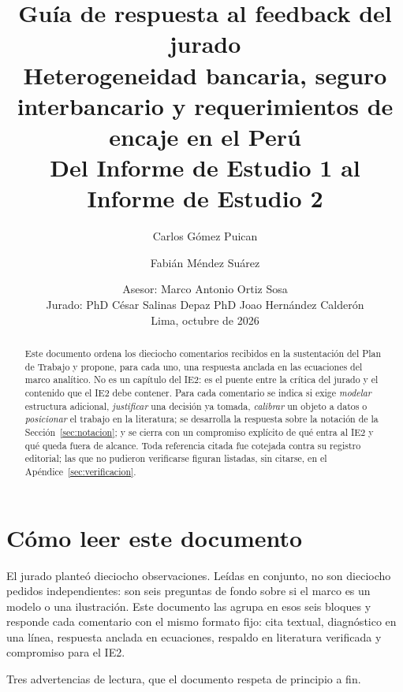 \documentclass[11pt]{article}
\title{\textbf{Gu\'ia de respuesta al feedback del jurado}\\[2mm]
\large Heterogeneidad bancaria, seguro interbancario y requerimientos de
encaje en el Per\'u\\[1mm]
\normalsize Del Informe de Estudio 1 al Informe de Estudio 2}
\author{Carlos G\'omez Puican \and Fabi\'an M\'endez Su\'arez}
\date{Asesor: Marco Antonio Ortiz Sosa\\[1mm]
Jurado: PhD C\'esar Salinas Depaz \quad PhD Joao Hern\'andez Calder\'on\\[2mm]
Lima, octubre de 2026}
\theoremstyle{definition}
\begin{document}
\maketitle

\begin{abstract}
\noindent Este documento ordena los dieciocho comentarios recibidos en la
sustentaci\'on del Plan de Trabajo y propone, para cada uno, una respuesta
anclada en las ecuaciones del marco anal\'itico. No es un cap\'itulo del IE2:
es el puente entre la cr\'itica del jurado y el contenido que el IE2 debe
contener. Para cada comentario se indica si exige \emph{modelar} estructura
adicional, \emph{justificar} una decisi\'on ya tomada, \emph{calibrar} un
objeto a datos o \emph{posicionar} el trabajo en la literatura; se desarrolla
la respuesta sobre la notaci\'on de la Secci\'on~\ref{sec:notacion}; y se cierra
con un compromiso expl\'icito de qu\'e entra al IE2 y qu\'e queda fuera de
alcance. Toda referencia citada fue cotejada contra su registro editorial; las
que no pudieron verificarse figuran listadas, sin citarse, en el
Ap\'endice~\ref{sec:verificacion}.
\end{abstract}

\tableofcontents
\newpage

\section{C\'omo leer este documento}

El jurado plante\'o dieciocho observaciones. Le\'idas en conjunto, no son
dieciocho pedidos independientes: son seis preguntas de fondo sobre si el
marco es un modelo o una ilustraci\'on. Este documento las agrupa en esos seis
bloques y responde cada comentario con el mismo formato fijo: cita textual,
diagn\'ostico en una l\'inea, respuesta anclada en ecuaciones, respaldo en
literatura verificada y compromiso para el IE2.

Tres advertencias de lectura, que el documento respeta de principio a fin.
\end{document}
